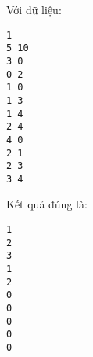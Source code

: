 Với dữ liệu:  
\begin{verbatim}
1
5 10
3 0
0 2
1 0
1 3
1 4
2 4
4 0
2 1
2 3
3 4
\end{verbatim}

   Kết quả đúng là:  
\begin{verbatim}
1
2
3
1
2
0
0
0
0
0
\end{verbatim}